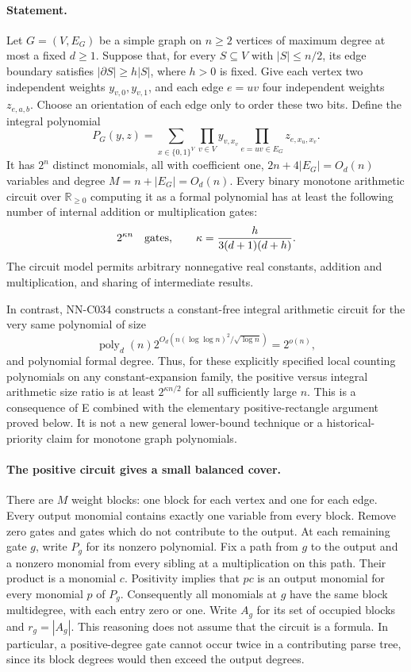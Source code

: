 \paragraph{Statement.}
Let $G=(V,E_G)$ be a simple graph on $n\ge2$ vertices of
maximum degree at most a fixed $d\ge1$. Suppose that, for every
$S\subseteq V$ with $|S|\le n/2$, its edge boundary satisfies
$|\partial S|\ge h|S|$, where $h>0$ is fixed.
Give each vertex two independent weights $y_{v,0},y_{v,1}$,
and each edge $e=uv$ four independent weights $z_{e,a,b}$.
Choose an orientation of each edge only to order these two bits.
Define the integral polynomial
\[
 P_G(y,z)=\sum_{x\in\{0,1\}^V}
      \prod_{v\in V}y_{v,x_v}
      \prod_{e=uv\in E_G}z_{e,x_u,x_v}.
\]
It has $2^n$ distinct monomials, all with coefficient one,
$2n+4|E_G|=O_d(n)$ variables and degree
$M=n+|E_G|=O_d(n)$. Every binary monotone arithmetic circuit
over $\mathbb R_{\ge0}$ computing it as a formal polynomial
has at least the following number of internal addition or multiplication gates:
\begin{equation}\label{eq:S019-lower}
 2^{\kappa n}\quad\hbox{gates},\qquad
            \kappa=\frac{h}{3(d+1)(d+h)}.
\end{equation}
The circuit model permits arbitrary nonnegative real constants,
addition and multiplication, and sharing of intermediate results.

In contrast, NN-C034 constructs a constant-free integral arithmetic
circuit for the very same polynomial of size
\[
 \operatorname{poly}_d(n)
 2^{O_d(n(\log\log n)^2/\sqrt{\log n})}=2^{o(n)},
\]
and polynomial formal degree. Thus, for these explicitly specified
local counting polynomials on any constant-expansion family,
the positive versus integral arithmetic size ratio is at least
$2^{\kappa n/2}$ for all sufficiently large $n$.
This is a consequence of E combined with the elementary
positive-rectangle argument proved below. It is not a new
general lower-bound technique or a historical-priority claim
for monotone graph polynomials.

\paragraph{The positive circuit gives a small balanced cover.}
There are $M$ weight blocks: one block for each vertex and one
for each edge. Every output monomial contains exactly one
variable from every block. Remove zero gates and gates which
do not contribute to the output. At each remaining gate $g$,
write $P_g$ for its nonzero polynomial. Fix a path from $g$
to the output and a nonzero monomial from every sibling at a
multiplication on this path. Their product is a monomial $c$.
Positivity implies that $pc$ is an output monomial for every
monomial $p$ of $P_g$. Consequently all monomials at $g$ have
the same block multidegree, with each entry zero or one.
Write $A_g$ for its set of occupied blocks and $r_g=|A_g|$.
This reasoning does not assume that the circuit is a formula.
In particular, a positive-degree gate cannot occur twice in
a contributing parse tree, since its block degrees would
then exceed the output degrees.

